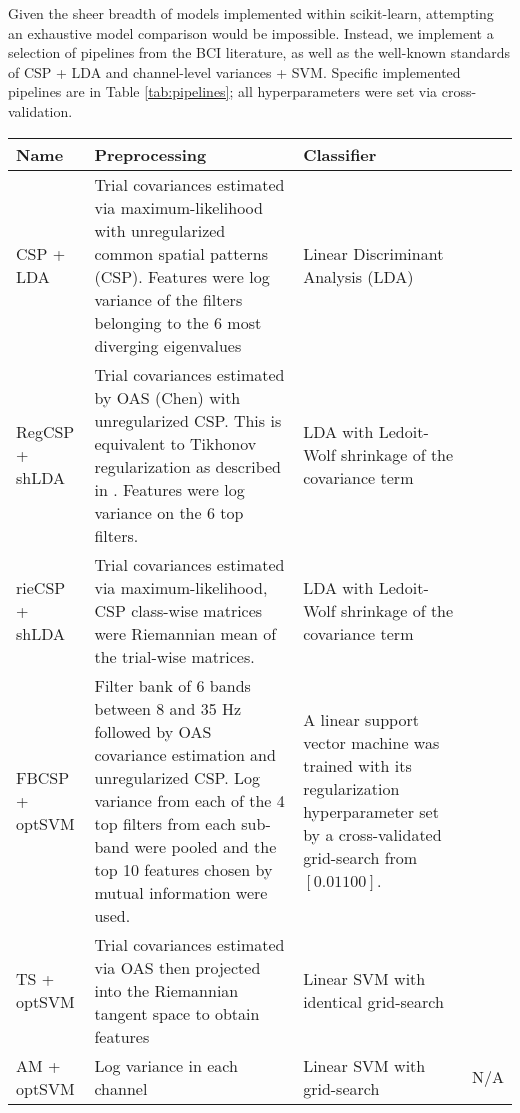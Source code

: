 Given the sheer breadth of models implemented within scikit-learn,
attempting an exhaustive model comparison would be impossible. Instead, we
implement a selection of pipelines from the BCI literature, as well as the
well-known standards of CSP + LDA and channel-level variances + SVM. Specific
implemented pipelines are in Table \ref{tab:pipelines}; all hyperparameters were set via cross-validation.
\begin{table*}
  \centering
  \begin{tabular}{ l || p{6cm} | p{6cm} | c | }
    
    Name & Preprocessing & Classifier \\ \hline
    CSP + LDA & Trial covariances estimated via maximum-likelihood with unregularized common spatial patterns (CSP). Features were log variance of the filters belonging to the 6 most diverging eigenvalues & Linear Discriminant Analysis (LDA) & \cite{Koles1990} \\ \hline
    RegCSP + shLDA & Trial covariances estimated by OAS (Chen) with
                     unregularized CSP. This is equivalent to Tikhonov
                     regularization as described in \cite{Lotte2011}. Features were log variance on the 6 top filters. & LDA with Ledoit-Wolf shrinkage of the covariance term  & \cite{Lotte2011} \\ \hline
    rieCSP + shLDA & Trial covariances estimated via maximum-likelihood, CSP class-wise matrices were Riemannian mean of the trial-wise matrices. & LDA with Ledoit-Wolf shrinkage of the covariance term  & \cite{TODO} \\ \hline
    FBCSP + optSVM & Filter bank of 6 bands between 8 and 35 Hz followed by OAS covariance estimation and unregularized CSP. Log variance from each of the 4 top filters from each sub-band were pooled and the top 10 features chosen by mutual information were used. & A linear support vector machine was trained with its regularization hyperparameter set by a cross-validated grid-search from $[0.01 100]$. & \cite{KaiKengAng2008} \\ \hline
    TS + optSVM & Trial covariances estimated via OAS then projected into the Riemannian tangent space to obtain features & Linear SVM with identical grid-search & \cite{Barachant2013} \\ \hline
    AM + optSVM & Log variance in each channel & Linear SVM with grid-search & N/A \\ \hline
    
  \end{tabular}
  \caption{Processing pipelines}
  \label{tab:pipelines}
\end{table*}
  

